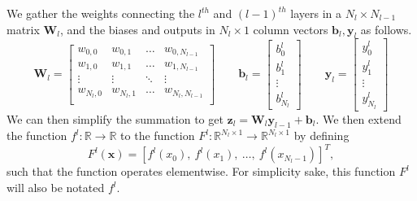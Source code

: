 \documentclass{article}
\theoremstyle{definition}
\begin{document}
We gather the weights connecting the $l^{th}$ and $(l-1)^{th}$ layers in a $N_{l} \times N_{l-1}$ matrix $\mathbf{W}_l$, and the biases and outputs in $N_l \times 1$ column vectors $\mathbf{b}_l, \mathbf{y}_l$ as follows.
\begin{equation*}
    \mathbf{W}_l = 
    \begin{bmatrix}
        w_{0,0} & w_{0,1} & \ldots & w_{0,N_{l-1}} \\
        w_{1,0} & w_{1,1} & \ldots & w_{1,N_{l-1}} \\
        \vdots & \vdots & \ddots & \vdots \\
        w_{N_{l},0} & w_{N_{l},1} & \ldots & w_{N_{l},N_{l-1}} \\
    \end{bmatrix}
    \qquad
    \mathbf{b}_l =
    \begin{bmatrix}
        b_0^l \\ b_1^l \\ \vdots \\ b_{N_l}^l
    \end{bmatrix}
    \qquad
    \mathbf{y}_l =
    \begin{bmatrix}
        y_0^l \\ y_1^l \\ \vdots \\ y_{N_l}^l
    \end{bmatrix}
\end{equation*}
We can then simplify the summation to get $\mathbf{z}_l = \mathbf{W}_l \mathbf{y}_{l-1} + \mathbf{b}_l$. We then extend the function $f^l: \mathbb{R} \to \mathbb{R}$ to the function $F^l: \mathbb{R}^{N_l \times 1} \to \mathbb{R}^{N_l \times 1}$ by defining
\begin{equation*}
    F^l(\boldsymbol{x}) = \left[ f^l \left( x_0 \right), \ f^l \left( x_1 \right), \ \ldots, \ f^l \left( x_{N_l - 1} \right) \right]^T,
\end{equation*}
such that the function operates elementwise. For simplicity sake, this function $F^l$ will also be notated $f^l$.
\end{document}
